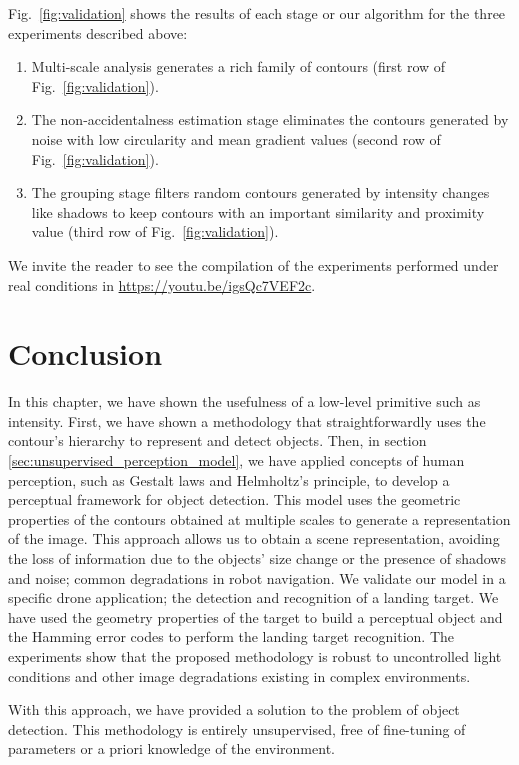Fig.\ \ref{fig:validation} shows the results of each stage or our algorithm for the three experiments described above:

\begin{enumerate}
	\item Multi-scale analysis generates a rich family of contours (first row of Fig.\ \ref{fig:validation}).
	\item The non-accidentalness estimation stage eliminates the contours generated by noise with low circularity and mean gradient values (second row of Fig.\ \ref{fig:validation}).
	\item The grouping stage filters random contours generated by intensity changes like shadows to keep contours with an important similarity and proximity value (third row of Fig.\ \ref{fig:validation}).
\end{enumerate}
We invite the reader to see the compilation of the experiments performed under real conditions in \url{https://youtu.be/igsQc7VEF2c}.

\section{Conclusion}\label{sec:conclusions_landing_target}
In this chapter, we have shown the usefulness of a low-level primitive such as intensity. First, we have shown a methodology that straightforwardly uses the contour's hierarchy to represent and detect objects. Then, in section \ref{sec:unsupervised_perception_model}, we have applied concepts of human perception, such as Gestalt laws and Helmholtz's principle, to develop a perceptual framework for object detection. This model uses the geometric properties of the contours obtained at multiple scales to generate a representation of the image. This approach allows us to obtain a scene representation, avoiding the loss of information due to the objects' size change or the presence of shadows and noise; common degradations in robot navigation. We validate our model in a specific drone application; the detection and recognition of a landing target. We have used the geometry properties of the target to build a perceptual object and the Hamming error codes to perform the landing target recognition. The experiments show that the proposed methodology is robust to uncontrolled light conditions and other image degradations existing in complex environments.

With this approach, we have provided a solution to the problem of object detection. This methodology is entirely unsupervised, free of fine-tuning of parameters or a priori knowledge of the environment. 

